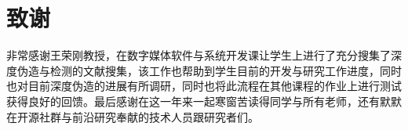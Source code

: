\chapter{致谢}

非常感谢王荣刚教授，在数字媒体软件与系统开发课让学生上进行了充分搜集了深度伪造与检测的文献搜集，该工作也帮助到学生目前的开发与研究工作进度，同时也对目前深度伪造的进展有所调研，同时也将此流程在其他课程的作业上进行测试获得良好的回馈。最后感谢在这一年来一起寒窗苦读得同学与所有老师，还有默默在开源社群与前沿研究奉献的技术人员跟研究者们。